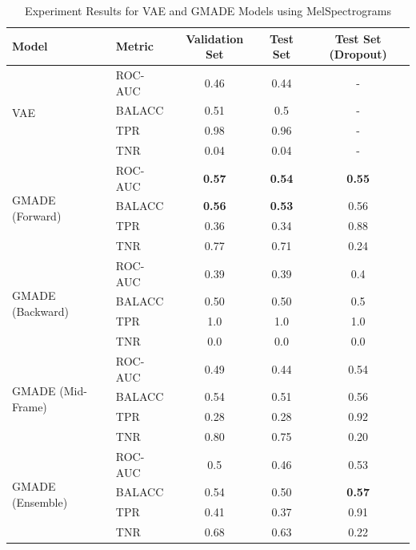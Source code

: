 \begin{table}[h!]
    \centering
    \caption{Experiment Results for VAE and GMADE Models using MelSpectrograms}
    \begin{tabular}{|l|l|c|c|c|}
    \hline
    \textbf{Model} & \textbf{Metric} & \textbf{Validation Set} & \textbf{Test Set} & \textbf{Test Set (Dropout)} \\
    \hline
    \multirow{4}{*}{VAE} 
    & ROC-AUC & 0.46 & 0.44 & - \\
    & BALACC  & 0.51 & 0.5 & - \\
    & TPR     & 0.98 & 0.96 & - \\
    & TNR     & 0.04 & 0.04 & - \\
    \hline
    \multirow{4}{*}{GMADE (Forward)}
    & ROC-AUC & \textbf{0.57} & \textbf{0.54} & \textbf{0.55} \\
    & BALACC  & \textbf{0.56} & \textbf{0.53} & 0.56 \\
    & TPR     & 0.36 & 0.34 & 0.88 \\
    & TNR     & 0.77 & 0.71 & 0.24 \\
    \hline
    \multirow{4}{*}{GMADE (Backward)}
    & ROC-AUC & 0.39 & 0.39 & 0.4 \\
    & BALACC  & 0.50 & 0.50 & 0.5 \\
    & TPR     & 1.0 & 1.0 & 1.0 \\
    & TNR     & 0.0 & 0.0 & 0.0 \\
    \hline
    \multirow{4}{*}{GMADE (Mid-Frame)}
    & ROC-AUC & 0.49 & 0.44 & 0.54 \\
    & BALACC  & 0.54 & 0.51 & 0.56 \\
    & TPR     & 0.28 & 0.28 & 0.92 \\
    & TNR     & 0.80 & 0.75 & 0.20 \\
    \hline
    \multirow{4}{*}{GMADE (Ensemble)}
    & ROC-AUC & 0.5 & 0.46 & 0.53 \\
    & BALACC  & 0.54 & 0.50 & \textbf{0.57} \\
    & TPR     & 0.41 & 0.37 & 0.91 \\
    & TNR     & 0.68 & 0.63 & 0.22 \\
    \hline
    \end{tabular}
    \label{fig:melspec}
\end{table}

